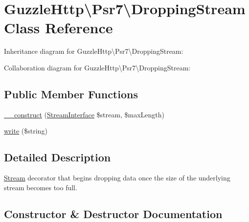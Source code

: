 \hypertarget{classGuzzleHttp_1_1Psr7_1_1DroppingStream}{}\section{Guzzle\+Http\textbackslash{}Psr7\textbackslash{}Dropping\+Stream Class Reference}
\label{classGuzzleHttp_1_1Psr7_1_1DroppingStream}


Inheritance diagram for Guzzle\+Http\textbackslash{}Psr7\textbackslash{}Dropping\+Stream\+:


Collaboration diagram for Guzzle\+Http\textbackslash{}Psr7\textbackslash{}Dropping\+Stream\+:
\subsection*{Public Member Functions}
\begin{DoxyCompactItemize}
\item 
\hyperlink{classGuzzleHttp_1_1Psr7_1_1DroppingStream_ac17f343d8a864f52391c32e5889f87d1}{\+\_\+\+\_\+construct} (\hyperlink{interfacePsr_1_1Http_1_1Message_1_1StreamInterface}{Stream\+Interface} \$stream, \$max\+Length)
\item 
\hyperlink{classGuzzleHttp_1_1Psr7_1_1DroppingStream_a4c915de6f99be0137ff754d0d3e76e9a}{write} (\$string)
\end{DoxyCompactItemize}


\subsection{Detailed Description}
\hyperlink{classGuzzleHttp_1_1Psr7_1_1Stream}{Stream} decorator that begins dropping data once the size of the underlying stream becomes too full. 

\subsection{Constructor \& Destructor Documentation}
\mbox{\label{classGuzzleHttp_1_1Psr7_1_1DroppingStream_ac17f343d8a864f52391c32e5889f87d1}} 
